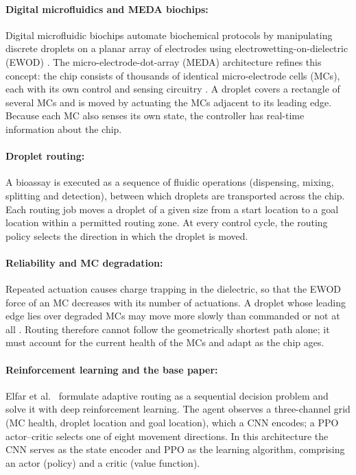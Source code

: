 \documentclass[11pt,a4paper]{article}
\begin{document}
\paragraph{Digital microfluidics and MEDA biochips:}
Digital microfluidic biochips automate biochemical protocols by manipulating
discrete droplets on a planar array of electrodes using
electrowetting-on-dielectric (EWOD) \cite{pollack2000,chakrabarty2006}.
The micro-electrode-dot-array (MEDA) architecture refines this concept: the
chip consists of thousands of identical micro-electrode cells (MCs), each with
its own control and sensing circuitry \cite{wang2011,li2017}. A droplet covers
a rectangle of several MCs and is moved by actuating the MCs adjacent to its
leading edge. Because each MC also senses its own state, the controller has
real-time information about the chip.

\paragraph{Droplet routing:}
A bioassay is executed as a sequence of fluidic operations (dispensing, mixing,
splitting and detection), between which droplets are transported across the
chip. Each routing job moves a droplet of a given size from a start location
to a goal location within a permitted routing zone. At every control cycle,
the routing policy selects the direction in which the droplet is moved.

\paragraph{Reliability and MC degradation:}
Repeated actuation causes charge trapping in the dielectric, so that the EWOD
force of an MC decreases with its number of actuations. A droplet whose
leading edge lies over degraded MCs may move more slowly than commanded or not
at all \cite{elfar2023}. Routing therefore cannot follow the geometrically
shortest path alone; it must account for the current health of the MCs and
adapt as the chip ages.

\paragraph{Reinforcement learning and the base paper:}
Elfar et al.\ \cite{elfar2022date,elfar2023} formulate adaptive routing as a
sequential decision problem and solve it with deep reinforcement learning.
The agent observes a three-channel grid (MC health, droplet location and goal
location), which a CNN encodes; a PPO actor--critic \cite{schulman2017}
selects one of eight movement directions. In this architecture the CNN serves
as the state encoder and PPO as the learning algorithm, comprising an actor
(policy) and a critic (value function).
\end{document}
